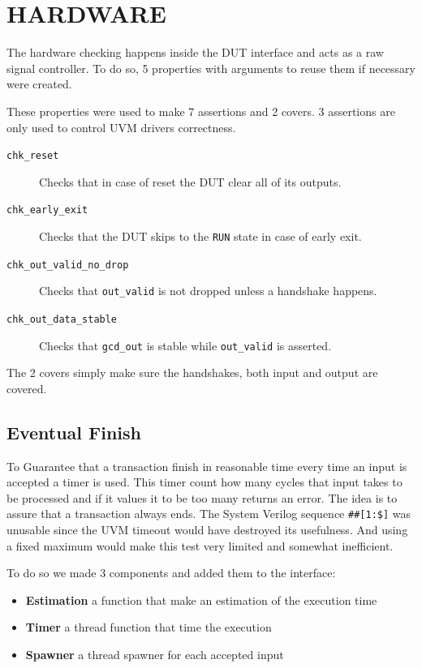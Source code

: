 \section{HARDWARE}
The hardware checking happens inside the DUT interface and acts as a raw signal controller.
To do so, 5 properties with arguments to reuse them if necessary were created.

These properties were used to make 7 assertions and 2 covers.
3 assertions are only used to control UVM drivers correctness.
\begin{description}
    \item[\texttt{chk\_reset}]
    Checks that in case of reset the DUT clear all of its outputs.
    \item[\texttt{chk\_early\_exit}]
    Checks that the DUT skips to the \texttt{RUN} state in case of early exit.
    \item[\texttt{chk\_out\_valid\_no\_drop}]
    Checks that \texttt{out\_valid} is not dropped unless a handshake happens.
    \item[\texttt{chk\_out\_data\_stable}]
    Checks that \texttt{gcd\_out} is stable while \texttt{out\_valid} is asserted.
\end{description}
The 2 covers simply make sure the handshakes, both input and output are covered.

\subsection*{Eventual Finish}
To Guarantee that a transaction finish in reasonable time every time an input is accepted a timer is used.
This timer count how many cycles that input takes to be processed and if it values it to be too many returns an error.
The idea is to assure that a transaction always ends.
The System Verilog sequence \texttt{\#\#[1:\$]} was unusable since the UVM timeout would have destroyed its usefulness.
And using a fixed maximum would make this test very limited and somewhat inefficient.

To do so we made 3 components and added them to the interface:
\begin{itemize}
    \item \textbf{Estimation} a function that make an estimation of the execution time
    
    \newpage
    \item \textbf{Timer} a thread function that time the execution
    
    \item \textbf{Spawner} a thread spawner for each accepted input
    
\end{itemize}

